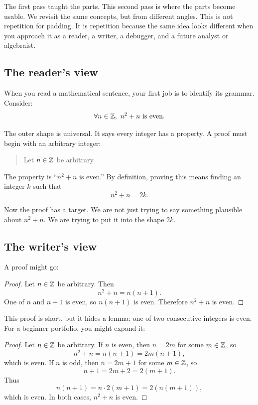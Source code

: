 \documentclass[12pt]{article}
\begin{document}
The first pass taught the parts. This second pass is where the parts become usable. We revisit the same concepts, but from different angles. This is not repetition for padding. It is repetition because the same idea looks different when you approach it as a reader, a writer, a debugger, and a future analyst or algebraist.

\subsection{The reader's view}

When you read a mathematical sentence, your first job is to identify its grammar. Consider:
\[
\forall n\in\Z,\ n^2+n\text{ is even}.
\]

The outer shape is universal. It says every integer has a property. A proof must begin with an arbitrary integer:

\begin{quote}
Let $n\in\mathbb{Z}$ be arbitrary.
\end{quote}

The property is ``$n^2+n$ is even.'' By definition, proving this means finding an integer $k$ such that
\[
n^2+n=2k.
\]

Now the proof has a target. We are not just trying to say something plausible about $n^2+n$. We are trying to put it into the shape $2k$.

\subsection{The writer's view}

A proof might go:

\begin{proof}
Let $n\in\mathbb{Z}$ be arbitrary. Then
\[
n^2+n=n(n+1).
\]
One of $n$ and $n+1$ is even, so $n(n+1)$ is even. Therefore $n^2+n$ is even.
\end{proof}

This proof is short, but it hides a lemma: one of two consecutive integers is even. For a beginner portfolio, you might expand it:

\begin{proof}
Let $n\in\mathbb{Z}$ be arbitrary. If $n$ is even, then $n=2m$ for some $m\in\mathbb{Z}$, so
\[
n^2+n=n(n+1)=2m(n+1),
\]
which is even. If $n$ is odd, then $n=2m+1$ for some $m\in\mathbb{Z}$, so
\[
n+1=2m+2=2(m+1).
\]
Thus
\[
n(n+1)=n\cdot2(m+1)=2(n(m+1)),
\]
which is even. In both cases, $n^2+n$ is even.
\end{proof}
\end{document}
